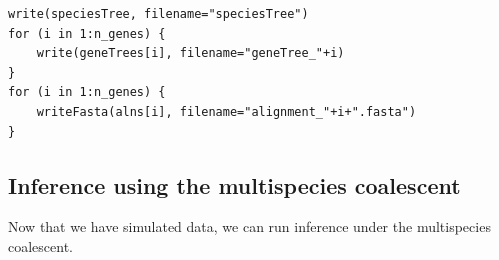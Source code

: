 \documentclass[11pt]{article}
\begin{document}
{\begin{framed}
 {\tt \begin{snugshade*}
\begin{lstlisting}
write(speciesTree, filename="speciesTree")
for (i in 1:n_genes) {
	write(geneTrees[i], filename="geneTree_"+i)
}
for (i in 1:n_genes) {
	writeFasta(alns[i], filename="alignment_"+i+".fasta")
}
\end{lstlisting}
\end{snugshade*}}
\end{framed}}

\subsection*{Inference using the multispecies coalescent }
Now that we have simulated data, we can run inference under the multispecies coalescent.
\end{document}
